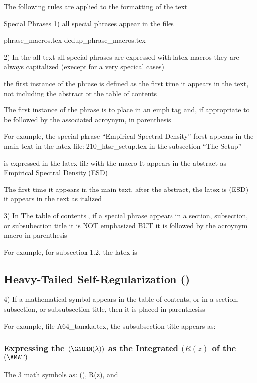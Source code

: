 The following rules are applied to the formatting of the text

Special Phrases
1) all special phrases appear in the files

phrase_macros.tex
dedup_phrase_macros.tex

2) In the all text
all special phrases are expressed with latex macros
they are  always capitalized (execept for a very specical cases)

the first instance of the phrase is defined as the first time it appears
in the text, not including the abstract or the table of contents

The first instance of the phrase is to place in an emph{} tag
and, if appropriate to be followed by the associated acroynym, in parenthesis

For example, the special phrase ``Empirical Spectral Density''
forst appears in the main text in the latex file:  210_htsr_setup.tex 
in the subsection ``The \HTSR Setup''

is expressed in the latex file with the macro \EmpiricalSpectralDensity
It appears in the abstract as Empirical Spectral Density (ESD)

The first time it appears in the main text, after the abstract,
the latex is  \emph{\EmpiricalSpectralDensity} (ESD)
it appears in the text as italized

3) In The table of contents , if a special phrase appears in a section,  subsection, or subsubection title
it is NOT emphasized BUT it is followed by the acroynym macro in parenthesis

For example, for subsection 1.2, the latex is
\subsection{Heavy-Tailed Self-Regularization (\HTSR)}


4) If a mathematical symbol appears in the table of contents, or in
a section, subsection, or subsubsection title, then it is placed in parenthesiss

For example, file A64_tanaka.tex, the subsubsection title appears as:
\subsubsection{Expressing the \GEN $(\GNORM(\lambda))$ as the Integrated \RTransform $(R(z)$ of the \CorrelationMatrix $(\AMAT)$}
The 3 math symbols as: \GNORM(\lambda), R(z), and \AMAT





